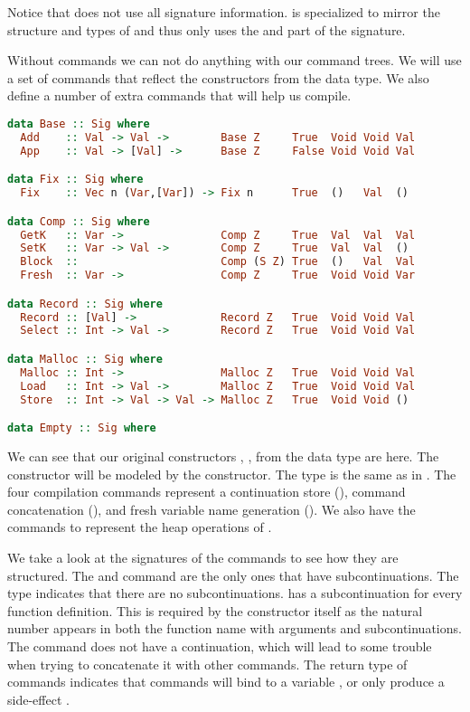Notice that  does not use all signature information.  is specialized to mirror the structure and types of  and thus only uses the  and  part of the signature.

Without commands we can not do anything with our command trees. We will use a set of commands that reflect the constructors from the  data type. We also define a number of extra commands that will help us compile.

\begin{lstlisting}[language=Haskell]
data Base :: Sig where
  Add    :: Val -> Val ->        Base Z     True  Void Void Val
  App    :: Val -> [Val] ->      Base Z     False Void Void Val

data Fix :: Sig where
  Fix    :: Vec n (Var,[Var]) -> Fix n      True  ()   Val  ()

data Comp :: Sig where
  GetK   :: Var ->               Comp Z     True  Val  Val  Val
  SetK   :: Var -> Val ->        Comp Z     True  Val  Val  ()
  Block  ::                      Comp (S Z) True  ()   Val  Val
  Fresh  :: Var ->               Comp Z     True  Void Void Var

data Record :: Sig where
  Record :: [Val] ->             Record Z   True  Void Void Val
  Select :: Int -> Val ->        Record Z   True  Void Void Val

data Malloc :: Sig where
  Malloc :: Int ->               Malloc Z   True  Void Void Val
  Load   :: Int -> Val ->        Malloc Z   True  Void Void Val
  Store  :: Int -> Val -> Val -> Malloc Z   True  Void Void ()

data Empty :: Sig where
\end{lstlisting}

We can see that our original constructors , ,  from the  data type are here. The  constructor will be modeled by the  constructor. The  type is the same as in . The four compilation commands represent a continuation store (), command concatenation (), and fresh variable name generation (). We also have the  commands to represent the heap operations of .

We take a look at the signatures of the commands to see how they are structured. The  and  command are the only ones that have subcontinuations. The  type indicates that there are no subcontinuations.  has a subcontinuation for every function definition. This is required by the constructor itself as the natural number  appears in both the function name with arguments and subcontinuations. The  command does not have a continuation, which will lead to some trouble when trying to concatenate it with other commands. The return type of commands indicates that commands will bind to a variable , or only produce a side-effect \icode{()}.

